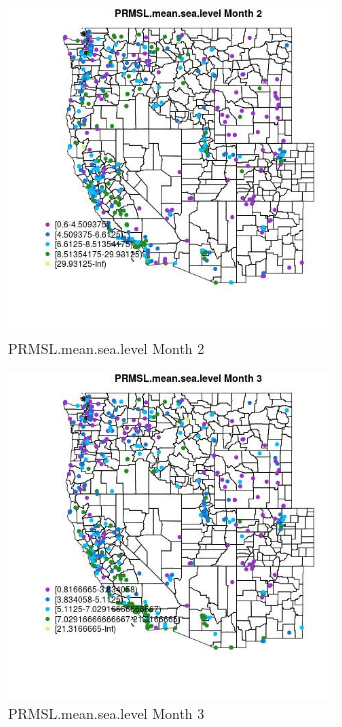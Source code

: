 \clearpage 

\begin{figure} 
\centering  
\includegraphics[width=0.77\textwidth]{Code_Outputs/ML_input_report_ML_input_PM25_Step5_part_d_de_duplicated_aves_ML_input_MapObsMo2PRMSLmeansealevel.jpg} 
\caption{\label{fig:ML_input_report_ML_input_PM25_Step5_part_d_de_duplicated_aves_ML_inputMapObsMo2PRMSLmeansealevel}PRMSL.mean.sea.level Month 2} 
\end{figure} 
 

\begin{figure} 
\centering  
\includegraphics[width=0.77\textwidth]{Code_Outputs/ML_input_report_ML_input_PM25_Step5_part_d_de_duplicated_aves_ML_input_MapObsMo3PRMSLmeansealevel.jpg} 
\caption{\label{fig:ML_input_report_ML_input_PM25_Step5_part_d_de_duplicated_aves_ML_inputMapObsMo3PRMSLmeansealevel}PRMSL.mean.sea.level Month 3} 
\end{figure} 
 


